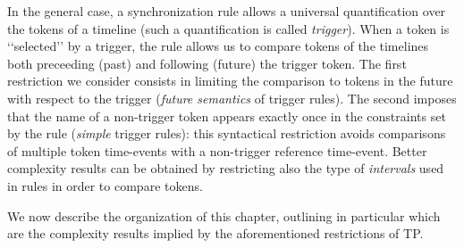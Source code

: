 In the general case, a synchronization rule allows a universal quantification over the tokens of a timeline (such a quantification is called \emph{trigger}).
When a token is \lq\lq selected\rq\rq{} by a trigger, the rule allows us to compare %
tokens of the timelines both preceeding (past) and following (future) the trigger token. 
The first restriction we consider consists in limiting the comparison to tokens in the future with respect to the trigger (\emph{future semantics} of trigger rules). 
The second imposes that the name of a non-trigger token appears exactly once in the constraints set by the rule (\emph{simple} trigger rules):
this syntactical restriction avoids comparisons of multiple token time-events with a non-trigger reference time-event.  
Better complexity results can be obtained by restricting also the type of \emph{intervals} used in rules in order to compare tokens.

We now describe the organization of this chapter, outlining in particular which are the complexity results implied by the aforementioned restrictions of TP.

